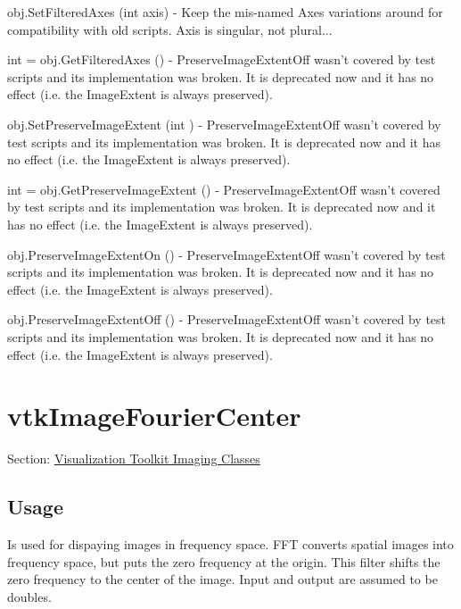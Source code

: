 \begin{DoxyItemize}
\item {\ttfamily obj.\-Set\-Filtered\-Axes (int axis)} -\/ Keep the mis-\/named Axes variations around for compatibility with old scripts. Axis is singular, not plural...  
\item {\ttfamily int = obj.\-Get\-Filtered\-Axes ()} -\/ Preserve\-Image\-Extent\-Off wasn't covered by test scripts and its implementation was broken. It is deprecated now and it has no effect (i.\-e. the Image\-Extent is always preserved).  
\item {\ttfamily obj.\-Set\-Preserve\-Image\-Extent (int )} -\/ Preserve\-Image\-Extent\-Off wasn't covered by test scripts and its implementation was broken. It is deprecated now and it has no effect (i.\-e. the Image\-Extent is always preserved).  
\item {\ttfamily int = obj.\-Get\-Preserve\-Image\-Extent ()} -\/ Preserve\-Image\-Extent\-Off wasn't covered by test scripts and its implementation was broken. It is deprecated now and it has no effect (i.\-e. the Image\-Extent is always preserved).  
\item {\ttfamily obj.\-Preserve\-Image\-Extent\-On ()} -\/ Preserve\-Image\-Extent\-Off wasn't covered by test scripts and its implementation was broken. It is deprecated now and it has no effect (i.\-e. the Image\-Extent is always preserved).  
\item {\ttfamily obj.\-Preserve\-Image\-Extent\-Off ()} -\/ Preserve\-Image\-Extent\-Off wasn't covered by test scripts and its implementation was broken. It is deprecated now and it has no effect (i.\-e. the Image\-Extent is always preserved).  
\end{DoxyItemize}\hypertarget{vtkimaging_vtkimagefouriercenter}{}\section{vtk\-Image\-Fourier\-Center}\label{vtkimaging_vtkimagefouriercenter}
Section\-: \hyperlink{sec_vtkimaging}{Visualization Toolkit Imaging Classes} \hypertarget{vtkwidgets_vtkxyplotwidget_Usage}{}\subsection{Usage}\label{vtkwidgets_vtkxyplotwidget_Usage}
Is used for dispaying images in frequency space. F\-F\-T converts spatial images into frequency space, but puts the zero frequency at the origin. This filter shifts the zero frequency to the center of the image. Input and output are assumed to be doubles.

